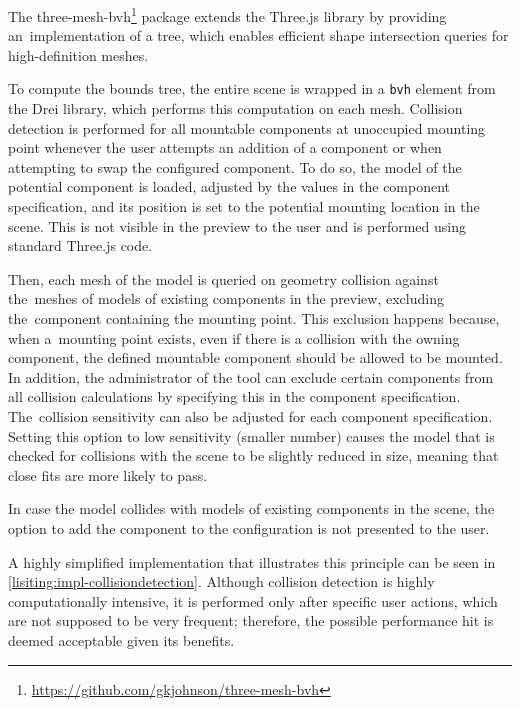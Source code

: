 The three-mesh-bvh\footnote{\url{https://github.com/gkjohnson/three-mesh-bvh}} package extends the Three.js library by providing an~implementation of a  tree, which enables efficient shape intersection queries for high-definition meshes.~\cite{Johnson2023}

To compute the bounds tree, the entire scene is wrapped in a \texttt{bvh} element from the Drei library, which performs this computation on each mesh. Collision detection is performed for all mountable components at unoccupied mounting point whenever the user attempts an addition of a component or when attempting to swap the configured component. To do so, the model of the potential component is loaded, adjusted by the values in the component specification, and its position is set to the potential mounting location in the scene. This is not visible in the preview to the user and is performed using standard Three.js code. 

Then, each mesh of the model is queried on geometry collision against the~meshes of models of existing components in the preview, excluding the~component containing the mounting point. This exclusion happens because, when a~mounting point exists, even if there is a collision with the owning component, the defined mountable component should be allowed to be mounted. In addition, the administrator of the tool can exclude certain components from all collision calculations by specifying this in the component specification. The~collision sensitivity can also be adjusted for each component specification. Setting this option to low sensitivity (smaller number) causes the model that is checked for collisions with the scene to be slightly reduced in size, meaning that close fits are more likely to pass.

In case the model collides with models of existing components in the scene, the option to add the component to the configuration is not presented to the user.

A highly simplified implementation that illustrates this principle can be seen in \autoref{lisiting:impl-collisiondetection}. Although collision detection is highly computationally intensive, it is performed only after specific user actions, which are not supposed to be very frequent; therefore, the possible performance hit is deemed acceptable given its benefits.

